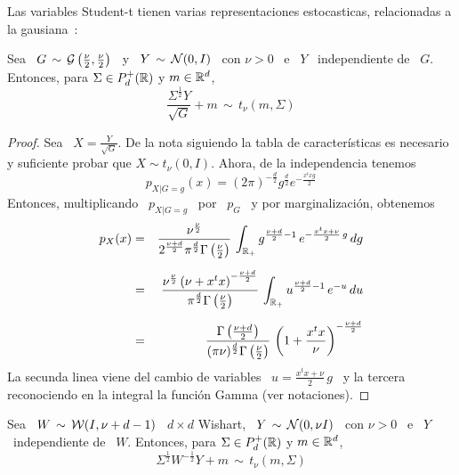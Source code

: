 Las   variables   Student-t   tienen   varias   representaciones   estocasticas,
relacionadas a la gausiana~\cite{FanKot90, And03, KotNad04}:
%
\begin{lema}\label{Lem:MP:StudentGamma}
%
  Sea \  $G \, \sim \,  \mathcal{G}\left( \frac{\nu}{2} , \frac{\nu}{2} \right)$ \ y \ $Y  \, \sim \,
  \mathcal{N}(0,I)$  \ con $\nu >  0$ \ e \  $Y$ \ independiente de  \ $G$. Entonces,
  para $\Sigma \in P_d^+(\mathbb{R})$ y $m \in \mathbb{R}^d$,
  \[
  \frac{\Sigma^{\frac12} Y}{\sqrt{G}} + m  \, \sim \, t_\nu(m,\Sigma)
  \]
\end{lema}
\begin{proof}
  Sea \ $X = \frac{Y}{\sqrt{G}}$. De la nota siguiendo la tabla de caracter\'isticas
  es  necesario  y suficiente  probar  que $X  \sim  t_\nu(0,I)$.  Ahora, de  la
  independencia tenemos
  \[
  p_{X|G=g}(x)  = (2  \pi)^{-\frac{d}{2}}  g^{\frac{d}{2}} e^{-  \frac{x^t x g}{2}}
  \]
  Entonces, multiplicando \ $p_{X|G=g}$ \ por \ $p_G$ \ y por marginalizaci\'on,
  obtenemos
  \begin{eqnarray*}
  p_X(x) & = & \frac{\nu^{\frac{\nu}{2}}}{2^{\frac{\nu+d}{2}} \pi^{\frac{d}{2}}
  \Gamma\left( \frac{\nu}{2} \right)} \, \int_{\mathbb{R}_+} g^{\frac{\nu+d}{2}-1} \,
  e^{- \frac{x^t x + \nu}{2} \, g} \, dg\\[2mm]
  & = & \frac{\nu^{\frac{\nu}{2}} \left( \nu + x^t x \right)^{-
  \frac{\nu+d}{2}}}{\pi^{\frac{d}{2}} \Gamma\left( \frac{\nu}{2} \right)} \,
  \int_{\mathbb{R}_+} u^{\frac{\nu+d}{2}-1} \, e^{- u} \, du\\[2mm]
  & = & \frac{\Gamma\left( \frac{\nu+d}{2} \right)}{(\pi \nu)^{\frac{d}{2}}
  \Gamma\left( \frac{\nu}{2} \right)} \, \left( 1 + \frac{x^t x}{\nu} \right)^{-
  \frac{\nu+d}{2}}
  \end{eqnarray*}
  La secunda linea viene del cambio de variables \ $u = \frac{x^t x + \nu}{2} \,
  g$  \  y la  tercera  reconociendo  en la  integral  la  funci\'on Gamma  (ver
  notaciones).
\end{proof}
%
%
\begin{lema}\label{Lem:MP:StudentWishart}
%
  Sea \  $W \, \sim \,  \mathcal{W}(I,\nu+d-1)$ \ $d \times  d$ Wishart, \ $Y  \, \sim \,
  \mathcal{N}(0,\nu I)$  \ con $\nu >  0$ \ e \  $Y$ \ independiente de  \ $W$. Entonces,
  para $\Sigma \in P_d^+(\mathbb{R})$ y $m \in \mathbb{R}^d$,
  \[
  \Sigma^{\frac12} W^{-\frac12} Y + m  \, \sim \, t_\nu(m,\Sigma)
  \]
\end{lema}
